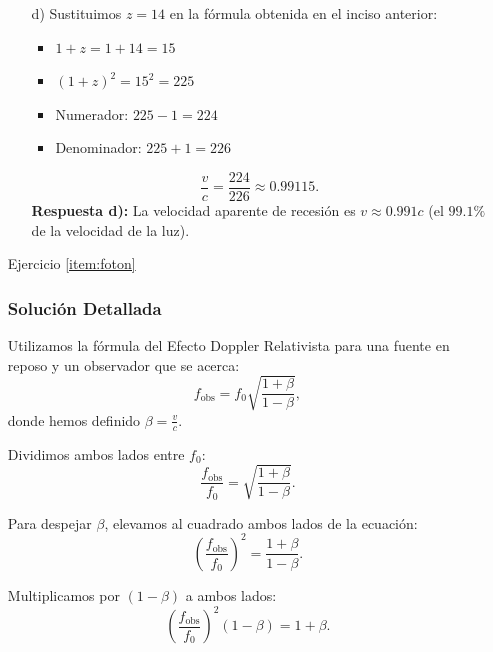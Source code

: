 \documentclass[11pt,a4paper]{book}
\begin{document}
\begin{itemize}
\begin{enumerate}
        \item[d)] Sustituimos $z = 14$ en la fórmula obtenida en el inciso anterior:
        \begin{itemize}
            \item $1 + z = 1 + 14 = 15$
            \item $(1 + z)^2 = 15^2 = 225$
            \item Numerador: $225 - 1 = 224$
            \item Denominador: $225 + 1 = 226$
        \end{itemize}
        \begin{equation}
            \frac{v}{c} = \frac{224}{226} \approx 0.99115.
        \end{equation}
        \textbf{Respuesta d):} La velocidad aparente de recesión es $v \approx 0.991c$ (el $99.1\%$ de la velocidad de la luz).
    \end{enumerate}


\item[Ejercicio \ref{item:foton}]

\subsubsection*{Solución Detallada}
    
    Utilizamos la fórmula del Efecto Doppler Relativista para una fuente en reposo y un observador que se acerca:
    \begin{equation}
        f_{\text{obs}} = f_0 \sqrt{\frac{1 + \beta}{1 - \beta}},
    \end{equation}
    donde hemos definido $\beta = \frac{v}{c}$.
    
    Dividimos ambos lados entre $f_0$:
    \begin{equation}
        \frac{f_{\text{obs}}}{f_0} = \sqrt{\frac{1 + \beta}{1 - \beta}}.
    \end{equation}
    
    Para despejar $\beta$, elevamos al cuadrado ambos lados de la ecuación:
    \begin{equation}
        \left(\frac{f_{\text{obs}}}{f_0}\right)^2 = \frac{1 + \beta}{1 - \beta}.
    \end{equation}
    
    Multiplicamos por $(1 - \beta)$ a ambos lados:
    \begin{equation}
        \left(\frac{f_{\text{obs}}}{f_0}\right)^2 (1 - \beta) = 1 + \beta.
    \end{equation}
    

\end{itemize}
\end{document}
